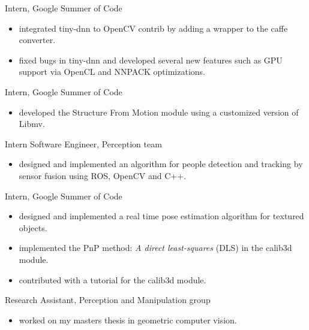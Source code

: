 \documentclass{article}
\begin{document}
\begin{llist}
Intern, Google Summer of Code
\vspace{-0.33cm}
\begin{itemize}
 \item integrated tiny-dnn to OpenCV contrib by adding a wrapper to the caffe converter.
 \item fixed bugs in tiny-dnn and developed several new features such as GPU support via OpenCL and NNPACK optimizations.
\end{itemize}

Intern, Google Summer of Code
\vspace{-0.33cm}
\begin{itemize}
 \item developed the Structure From Motion module using a customized version of Libmv.
\end{itemize}

Intern Software Engineer, Perception team
\vspace{-0.33cm}
\begin{itemize}
 \item designed and implemented an algorithm for people detection and tracking by sensor fusion using ROS, OpenCV and C++.
\end{itemize}

Intern, Google Summer of Code
\vspace{-0.33cm}
\begin{itemize}
 \item designed and implemented a real time pose estimation algorithm for textured objects.
 \item implemented the PnP method: \textit{A direct least-squares} (DLS) in the calib3d module.
 \item contributed with a tutorial for the calib3d module.
\end{itemize}

Research Assistant, Perception and Manipulation group
\vspace{-0.33cm}
\begin{itemize}
 \item worked on my masters thesis in geometric computer vision.
\end{itemize}



\end{llist}
\end{document}
